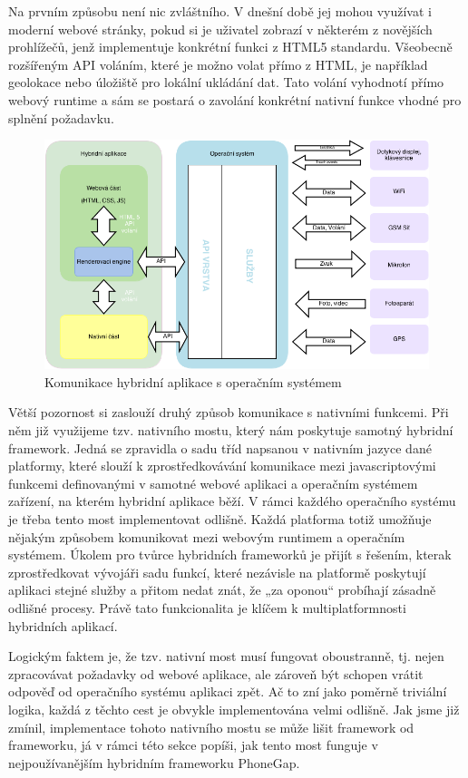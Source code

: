 Na prvním způsobu není nic zvláštního. V dnešní době jej mohou využívat i moderní webové stránky, pokud si je uživatel zobrazí v některém z novějších prohlížečů, jenž implementuje konkrétní funkci z HTML5 standardu. Všeobecně rozšířeným API voláním, které je možno volat přímo z HTML, je například geolokace nebo úložiště pro lokální ukládání dat. Tato volání vyhodnotí přímo webový runtime a sám se postará o zavolání konkrétní nativní funkce vhodné pro splnění požadavku.

\begin{figure}\centering
\includegraphics[width=1.0\textwidth]{hybridni_aplikace_komunikace.png}
\caption{Komunikace hybridní aplikace s operačním systémem}
\label{fig:HybridAppCommunication}
\end{figure} 

Větší pozornost si zaslouží druhý způsob komunikace s nativními funkcemi. Při něm již využijeme tzv. nativního mostu, který nám poskytuje samotný hybridní framework. Jedná se zpravidla o sadu tříd napsanou v nativním jazyce dané platformy, které slouží k zprostředkovávání komunikace mezi javascriptovými funkcemi definovanými v samotné webové aplikaci a operačním systémem zařízení, na kterém hybridní aplikace běží. V rámci každého operačního systému je třeba tento most implementovat odlišně. Každá platforma totiž umožňuje nějakým způsobem komunikovat mezi webovým runtimem a operačním systémem. Úkolem pro tvůrce hybridních frameworků je přijít s řešením, kterak zprostředkovat vývojáři sadu funkcí, které nezávisle na platformě poskytují aplikaci stejné služby a přitom nedat znát, že „za oponou“ probíhají zásadně odlišné procesy. Právě tato funkcionalita je klíčem k multiplatformnosti hybridních aplikací.

Logickým faktem je, že tzv. nativní most musí fungovat oboustranně, tj. nejen zpracovávat požadavky od webové aplikace, ale zároveň být schopen vrátit odpověď od operačního systému aplikaci zpět. Ač to zní jako poměrně triviální logika, každá z těchto cest je obvykle implementována velmi odlišně. Jak jsme již zmínil, implementace tohoto nativního mostu se může lišit framework od frameworku, já v rámci této sekce popíši, jak tento most funguje v nejpoužívanějším hybridním frameworku PhoneGap.

